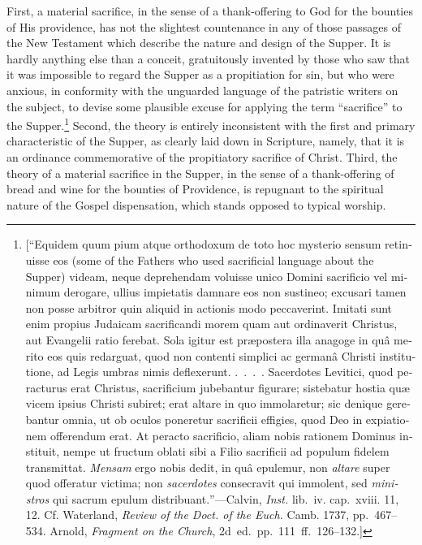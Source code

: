 \documentclass[
  english,
]{book}
\providecommand{\textlatin}{}
\renewcommand{\textlatin}[2][]{\foreignlanguage{latin}{#2}}
\newcommand{\textenglish}[2][]{\foreignlanguage{english}{#2}}
\begin{document}
First, a material sacrifice, in the sense of a thank-offering to God for the bounties of His providence, has not the slightest countenance in any of those passages of the New Testament which describe the nature and design of the Supper. It is hardly anything else than a conceit, gratuitously invented by those who saw that it was impossible to regard the Supper as a propitiation for sin, but who were anxious, in conformity with the unguarded language of the patristic writers on the subject, to devise some plausible excuse for applying the term ``sacrifice'' to the Supper.\footnote{{[}``\textlatin{Equidem quum pium atque orthodoxum de toto hoc mysterio sensum retinuisse eos (\textenglish{some of the Fathers who used sacrificial language about the Supper}) videam, neque deprehendam voluisse unico Domini sacrificio vel minimum derogare, ullius impietatis damnare eos non sustineo; excusari tamen non posse arbitror quin aliquid in actionis modo peccaverint. Imitati sunt enim propius Judaicam sacrificandi morem quam aut ordinaverit Christus, aut Evangelii ratio ferebat. Sola igitur est præpostera illa anagoge in quâ merito eos quis redarguat, quod non contenti simplici ac germanâ Christi institutione, ad Legis umbras nimis deflexerunt. .~.~.~. Sacerdotes Levitici, quod peracturus erat Christus, sacrificium jubebantur figurare; sistebatur hostia quæ vicem ipsius Christi subiret; erat altare in quo immolaretur; sic denique gerebantur omnia, ut ob oculos poneretur sacrificii effigies, quod Deo in expiationem offerendum erat. At peracto sacrificio, aliam nobis rationem Dominus instituit, nempe ut fructum oblati sibi a Filio sacrificii ad populum fidelem transmittat. \emph{Mensam} ergo nobis dedit, in quâ epulemur, non \emph{altare} super quod offeratur victima; non \emph{sacerdotes} consecravit qui immolent, sed \emph{ministros} qui sacrum epulum distribuant.}''---Calvin, \emph{Inst.} lib.~iv. cap.~xviii. 11, 12. Cf. Waterland, \emph{Review of the Doct. of the Euch.} Camb. 1737, pp.~467--534. Arnold, \emph{Fragment on the Church}, 2d~ed.~pp.~111~ff.~126--132.{]}} Second, the theory is entirely inconsistent with the first and primary characteristic of the Supper, as clearly laid down in Scripture, namely, that it is an ordinance commemorative of the propitiatory sacrifice of Christ. Third, the theory of a material sacrifice in the Supper, in the sense of a thank-offering of bread and wine for the bounties of Providence, is repugnant to the spiritual nature of the Gospel dispensation, which stands opposed to typical worship.
\end{document}
